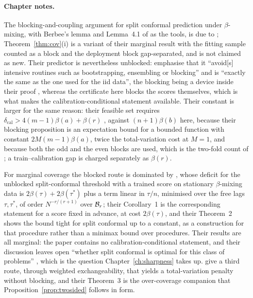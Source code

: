 \documentclass[../../../main.tex]{subfiles}
\begin{document}
\paragraph{Chapter notes.} The blocking-and-coupling argument for split conformal prediction under $\beta$-mixing, with Berbee's lemma and Lemma~4.1 of \cite{yu1994} as the tools, is due to \cite{oliveira2024}; Theorem~\ref{thm:cov}(i) is a variant of their marginal result with the fitting sample counted as a block and the deployment block gap-separated, and is not claimed as new. Their predictor is nevertheless unblocked: \citet[p.~2]{oliveira2024} emphasise that it ``avoid[s] intensive routines such as bootstrapping, ensembling or blocking'' and is ``exactly the same as the one used for the iid data'', the blocking being a device inside their proof \citep[Prop.~10, pp.~20--21]{oliveira2024}, whereas the certificate here blocks the scores themselves, which is what makes the calibration-conditional statement available. Their constant is larger for the same reason: their feasible set requires $\delta_{\mathrm{cal}}>4(m-1)\beta(a)+\beta(r)$ \citep[eq.~(12), p.~7]{oliveira2024}, against $(n+1)\beta(b)$ here, because their blocking proposition is an expectation bound for a bounded function with constant $2M(m-1)\beta(a)$, twice the total-variation cost at $M=1$, and because both the odd and the even blocks are used, which is the two-fold count of \citep[Lemma~4.2, p.~103]{yu1994}; a train--calibration gap is charged separately as $\beta(r)$.

For marginal coverage the blocked route is dominated by \citep[Cor.~2]{barber2026}, whose deficit for the unblocked split-conformal threshold with a trained score on stationary $\beta$-mixing data is $2\beta(\tau)+2\beta(\tau^*)$ plus a term linear in $\tau/n$, minimised over the free lags $\tau,\tau^*$, of order $N^{-r/(r+1)}$ over $\mathcal B_{r}$; their Corollary~1 is the corresponding statement for a score fixed in advance, at cost $2\beta(\tau)$, and their Theorem~2 shows the bound tight for split conformal up to a constant, as a construction for that procedure rather than a minimax bound over procedures. Their results are all marginal: the paper contains no calibration-conditional statement, and their discussion leaves open ``whether split conformal is optimal for this class of problems'' \citep[Sec.~4]{barber2026}, which is the question Chapter~\ref{ch:sharpness} takes up. \cite{barber2023} give a third route, through weighted exchangeability, that yields a total-variation penalty without blocking, and their Theorem~3 is the over-coverage companion that Proposition~\ref{prop:twosided} follows in form.
\end{document}
